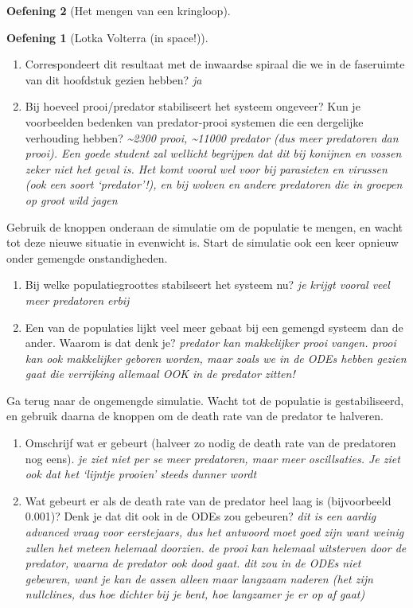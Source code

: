 \documentclass[
  a4paper,
]{scrbook}
\theoremstyle{definition}
\newtheorem{exercise}{Oefening}[chapter]
\theoremstyle{remark}
\begin{document}
\begin{exercise}[Het mengen van een
kringloop]
\begin{exercise}[Lotka Volterra (in
space!)]
\begin{enumerate}
\def\labelenumi{\alph{enumi}.}
\setcounter{enumi}{1}
\item
  Correspondeert dit resultaat met de inwaardse spiraal die we in de
  faseruimte van dit hoofdstuk gezien hebben? \emph{ja}
\item
  Bij hoeveel prooi/predator stabiliseert het systeem ongeveer? Kun je
  voorbeelden bedenken van predator-prooi systemen die een dergelijke
  verhouding hebben? \emph{\textasciitilde2300 prooi,
  \textasciitilde11000 predator (dus meer predatoren dan prooi). Een
  goede student zal wellicht begrijpen dat dit bij konijnen en vossen
  zeker niet het geval is. Het komt vooral wel voor bij parasieten en
  virussen (ook een soort `predator'!), en bij wolven en andere
  predatoren die in groepen op groot wild jagen}
\end{enumerate}

Gebruik de knoppen onderaan de simulatie om de populatie te mengen, en
wacht tot deze nieuwe situatie in evenwicht is. Start de simulatie ook
een keer opnieuw onder gemengde onstandigheden.

\begin{enumerate}
\def\labelenumi{\alph{enumi}.}
\setcounter{enumi}{3}
\item
  Bij welke populatiegroottes stabilseert het systeem nu? \emph{je
  krijgt vooral veel meer predatoren erbij}
\item
  Een van de populaties lijkt veel meer gebaat bij een gemengd systeem
  dan de ander. Waarom is dat denk je? \emph{predator kan makkelijker
  prooi vangen. prooi kan ook makkelijker geboren worden, maar zoals we
  in de ODEs hebben gezien gaat die verrijking allemaal OOK in de
  predator zitten!}
\end{enumerate}

Ga terug naar de ongemengde simulatie. Wacht tot de populatie is
gestabiliseerd, en gebruik daarna de knoppen om de death rate van de
predator te halveren.

\begin{enumerate}
\def\labelenumi{\alph{enumi}.}
\setcounter{enumi}{5}
\item
  Omschrijf wat er gebeurt (halveer zo nodig de death rate van de
  predatoren nog eens). \emph{je ziet niet per se meer predatoren, maar
  meer oscillsaties. Je ziet ook dat het `lijntje prooien' steeds dunner
  wordt }
\item
  Wat gebeurt er als de death rate van de predator heel laag is
  (bijvoorbeeld 0.001)? Denk je dat dit ook in de ODEs zou gebeuren?
  \emph{dit is een aardig advanced vraag voor eerstejaars, dus het
  antwoord moet goed zijn want weinig zullen het meteen helemaal
  doorzien. de prooi kan helemaal uitsterven door de predator, waarna de
  predator ook dood gaat. dit zou in de ODEs niet gebeuren, want je kan
  de assen alleen maar langzaam naderen (het zijn nullclines, dus hoe
  dichter bij je bent, hoe langzamer je er op af gaat)}
\end{enumerate}


\end{exercise}
\end{exercise}
\end{document}
